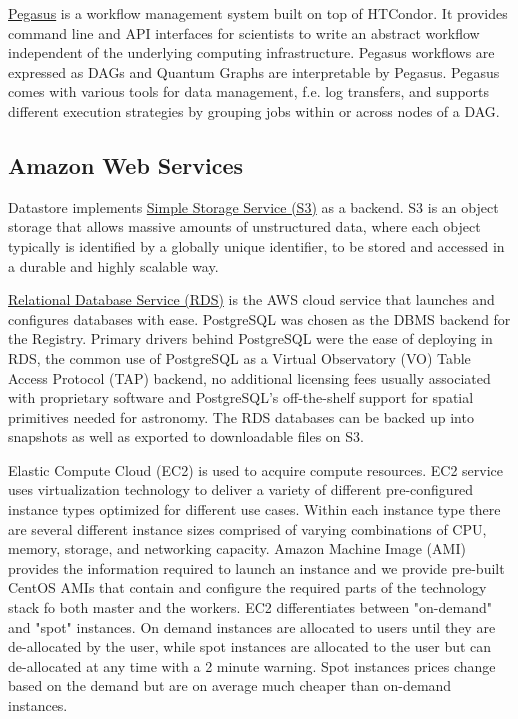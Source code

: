 \documentclass[a4paper, 10pt, conference]{ieeeconf}
\begin{document}
\href{https://pegasus.isi.edu/}{Pegasus} \cite{Deelman:2015:Pegasus} is a workflow management system built on top of HTCondor.
It provides command line and API interfaces for scientists to write an abstract workflow independent of the underlying computing infrastructure. Pegasus workflows are expressed as DAGs and Quantum Graphs are interpretable by Pegasus. Pegasus comes with various tools for data management, f.e. log transfers, and supports different execution strategies by grouping jobs within or across nodes of a DAG.


\subsection{Amazon Web Services}
\label{subsec:aws}

Datastore implements \href{https://aws.amazon.com/s3/}{Simple Storage Service (S3)} as a backend. S3 is an object storage that allows massive amounts of unstructured data, where each object typically is identified by a globally unique identifier, to be stored and accessed in a durable and highly scalable way.

\href{https://aws.amazon.com/rds/}{Relational Database Service (RDS)} is the AWS cloud service that launches and configures databases with ease. PostgreSQL was chosen as the DBMS backend for the Registry. Primary drivers behind PostgreSQL were the ease of deploying in RDS, the common use of PostgreSQL as a Virtual Observatory (VO) Table Access Protocol (TAP) backend, no additional licensing fees usually associated with proprietary software and PostgreSQL's off-the-shelf support for spatial primitives needed for astronomy. The RDS databases can be backed up into snapshots as well as exported to downloadable files on S3.

Elastic Compute Cloud (EC2) is used to acquire compute resources.  EC2 service uses virtualization technology to deliver a variety of different pre-configured instance types optimized for different use cases. Within each instance type there are several different instance sizes comprised of varying combinations of CPU, memory, storage, and networking capacity. Amazon Machine Image (AMI) provides the information required to launch an instance and we provide pre-built CentOS AMIs that contain and configure the required parts of the technology stack fo both master and the workers. EC2 differentiates between "on-demand" and "spot" instances. On demand instances are allocated to users until they are de-allocated by the user, while spot instances are allocated to the user but can de-allocated at any time with a 2 minute warning. Spot instances prices change based on the demand but are on average much cheaper than on-demand instances.
\end{document}
